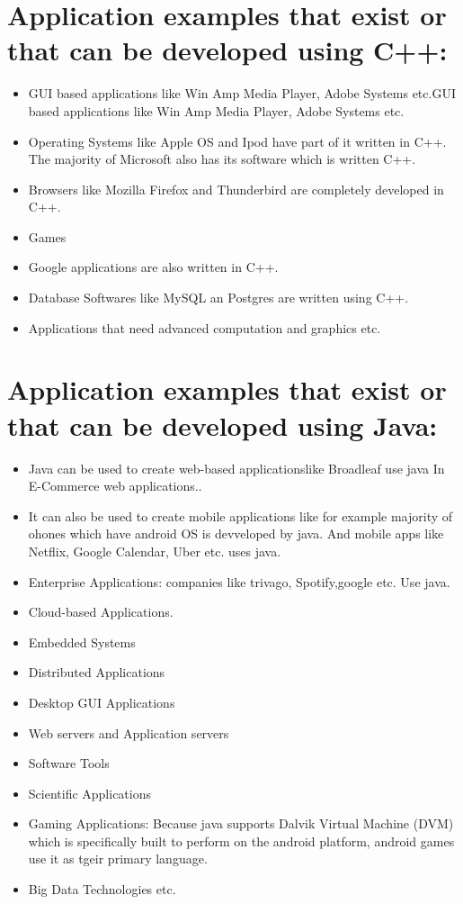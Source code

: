 \documentclass{article}
\begin{document}
	\section*{Application examples that exist or that can be developed using C++:}
	\begin{itemize}
		\item GUI based applications like Win Amp Media Player, Adobe Systems etc.GUI based applications like Win Amp Media Player, Adobe Systems etc.
		\item Operating Systems like Apple OS and Ipod have part of it  written in C++. The majority of Microsoft also has its software which is written C++.
		\item Browsers like Mozilla Firefox and Thunderbird are completely developed in C++.
		\item Games
		\item Google applications are also written in C++.
		\item Database Softwares like MySQL an Postgres are written using C++.
		\item Applications that need advanced computation and graphics etc.
	\end{itemize}
	\section*{Application examples that exist or that can be developed using Java:}
        \begin{itemize}
        	\item Java can be used to create web-based applicationslike Broadleaf use java In E-Commerce web applications..
        	\item It can also be used to create mobile applications like for example majority of ohones which have android OS  is devveloped by java. And mobile apps like Netflix, Google Calendar, Uber etc. uses java.
        	\item Enterprise Applications: companies like trivago, Spotify,google etc. Use java.
        	\item Cloud-based Applications.
         	\item Embedded Systems
        	\item Distributed Applications
        	\item Desktop GUI Applications
        	\item Web servers and Application servers
        	\item Software Tools
        	\item Scientific Applications
        	\item Gaming Applications: Because java supports Dalvik Virtual Machine (DVM) which is specifically built to perform on the android platform, android games use it as tgeir primary language.
        	\item Big Data Technologies etc.
        \end{itemize}
\end{document}
